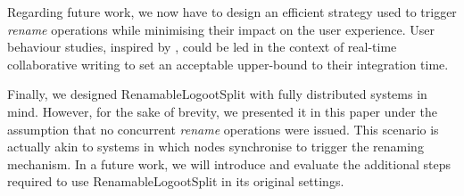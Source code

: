 \documentclass[sigplan,10pt]{acmart}
\begin{document}
Regarding future work, we now have to design an efficient strategy used to trigger \emph{rename} operations while minimising their impact on the user experience.
User behaviour studies, inspired by \cite{ignat:hal-01088815,ignat:hal-01238831}, could be led in the context of real-time collaborative writing to set an acceptable upper-bound to their integration time.

Finally, we designed RenamableLogootSplit with fully distributed systems in mind.
However, for the sake of brevity, we presented it in this paper under the assumption that no concurrent \emph{rename} operations were issued.
This scenario is actually akin to systems in which nodes synchronise to trigger the renaming mechanism.
In a future work, we will introduce and evaluate the additional steps required to use RenamableLogootSplit in its original settings.


\end{document}
